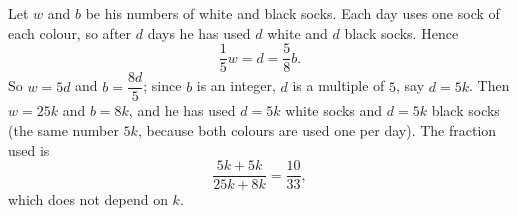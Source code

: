 Let $w$ and $b$ be his numbers of white and black socks. Each day uses one sock of each colour, so after $d$ days he has used $d$ white and $d$ black socks. Hence
\[
\dfrac{1}{5}w=d=\dfrac{5}{8}b .
\]
So $w=5d$ and $b=\dfrac{8d}{5}$; since $b$ is an integer, $d$ is a multiple of $5$, say $d=5k$. Then $w=25k$ and $b=8k$, and he has used $d=5k$ white socks and $d=5k$ black socks (the same number $5k$, because both colours are used one per day). The fraction used is
\[
\dfrac{5k+5k}{25k+8k}=\boxed{\dfrac{10}{33}},
\]
which does not depend on $k$.
